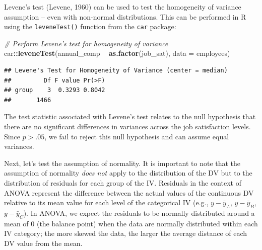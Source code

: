 \documentclass[]{book}
\newenvironment{Shaded}{\begin{snugshade}}{\end{snugshade}}
\newcommand{\CommentTok}[1]{\textcolor[rgb]{0.56,0.35,0.01}{\textit{#1}}}
\newcommand{\DataTypeTok}[1]{\textcolor[rgb]{0.13,0.29,0.53}{#1}}
\newcommand{\KeywordTok}[1]{\textcolor[rgb]{0.13,0.29,0.53}{\textbf{#1}}}
\newcommand{\NormalTok}[1]{#1}
\newcommand{\OperatorTok}[1]{\textcolor[rgb]{0.81,0.36,0.00}{\textbf{#1}}}
\newcommand{\StringTok}[1]{\textcolor[rgb]{0.31,0.60,0.02}{#1}}
\begin{document}
Levene's test (Levene, 1960) can be used to test the homogeneity of variance assumption -- even with non-normal distributions. This can be performed in R using the \texttt{leveneTest()} function from the \texttt{car} package:

\begin{Shaded}
\begin{Highlighting}[]
\CommentTok{# Perform Levene's test for homogeneity of variance}
\NormalTok{car}\OperatorTok{::}\KeywordTok{leveneTest}\NormalTok{(annual_comp }\OperatorTok{~}\StringTok{ }\KeywordTok{as.factor}\NormalTok{(job_sat), }\DataTypeTok{data =}\NormalTok{ employees)}
\end{Highlighting}
\end{Shaded}

\begin{verbatim}
## Levene's Test for Homogeneity of Variance (center = median)
##         Df F value Pr(>F)
## group    3  0.3293 0.8042
##       1466
\end{verbatim}

The test statistic associated with Levene's test relates to the null hypothesis that there are no significant differences in variances across the job satisfaction levels. Since \(p > .05\), we fail to reject this null hypothesis and can assume equal variances.

Next, let's test the assumption of normality. It is important to note that the assumption of normality \emph{does not} apply to the distribution of the DV but to the distribution of residuals for each group of the IV. Residuals in the context of ANOVA represent the difference between the actual values of the continuous DV relative to its mean value for each level of the categorical IV (e.g., \(y - \bar{y}_A\), \(y - \bar{y}_B\), \(y - \bar{y}_C\)). In ANOVA, we expect the residuals to be normally distributed around a mean of 0 (the balance point) when the data are normally distributed within each IV category; the more skewed the data, the larger the average distance of each DV value from the mean.
\end{document}
